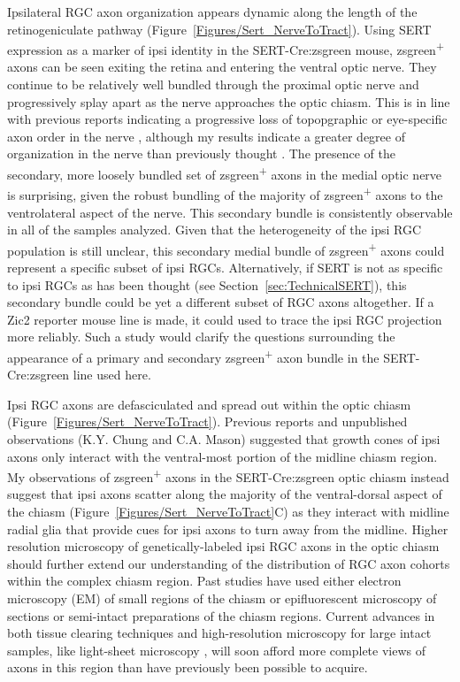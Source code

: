 Ipsilateral RGC axon organization appears dynamic along the length of the retinogeniculate pathway (Figure~\ref{Figures/Sert_NerveToTract}).
Using SERT expression as a marker of ipsi identity in the SERT-Cre:zsgreen mouse, zsgreen\textsuperscript{+} axons can be seen exiting the retina and entering the ventral optic nerve.
They continue to be relatively well bundled through the proximal optic nerve and progressively splay apart as the nerve approaches the optic chiasm.
This is in line with previous reports indicating a progressive loss of topopgraphic or eye-specific axon order in the nerve \cite{colello1990early,chan1994changes,chan1999changes}, although my results indicate a greater degree of organization in the nerve than previously thought \cite{colello1990early,baker1989distribution}.
The presence of the secondary, more loosely bundled set of zsgreen\textsuperscript{+} axons in the medial optic nerve is surprising, given the robust bundling of the majority of zsgreen\textsuperscript{+} axons to the ventrolateral aspect of the nerve.
This secondary bundle is consistently observable in all of the samples analyzed.
Given that the heterogeneity of the ipsi RGC population is still unclear, this secondary medial bundle of zsgreen\textsuperscript{+} axons could represent a specific subset of ipsi RGCs.
Alternatively, if SERT is not as specific to ipsi RGCs as has been thought (see Section~\ref{sec:TechnicalSERT}), this secondary bundle could be yet a different subset of RGC axons altogether.
If a Zic2 reporter mouse line is made, it could used to trace the ipsi RGC projection more reliably.
Such a study would clarify the questions surrounding the appearance of a primary and secondary zsgreen\textsuperscript{+} axon bundle in the SERT-Cre:zsgreen line used here.

Ipsi RGC axons are defasciculated and spread out within the optic chiasm (Figure~\ref{Figures/Sert_NerveToTract}).
Previous reports \cite{colello1997changing} and unpublished observations (K.Y. Chung and C.A. Mason) suggested that growth cones of ipsi axons only interact with the ventral-most portion of the midline chiasm region.
My observations of zsgreen\textsuperscript{+} axons in the SERT-Cre:zsgreen optic chiasm instead suggest that ipsi axons scatter along the majority of the ventral-dorsal aspect of the chiasm (Figure~\ref{Figures/Sert_NerveToTract}C) as they interact with midline radial glia that provide cues for ipsi axons to turn away from the midline.
Higher resolution microscopy of genetically-labeled ipsi RGC axons in the optic chiasm should further extend our understanding of the distribution of RGC axon cohorts within the complex chiasm region.
Past studies have used either electron microscopy (EM) of small regions of the chiasm or epifluorescent microscopy of sections or semi-intact preparations of the chiasm regions. %
Current advances in both tissue clearing techniques \cite{tainaka2015chemical} and high-resolution microscopy for large intact samples, like light-sheet microscopy \cite{keller2015visualizing}, will soon afford more complete views of axons in this region than have previously been possible to acquire.

